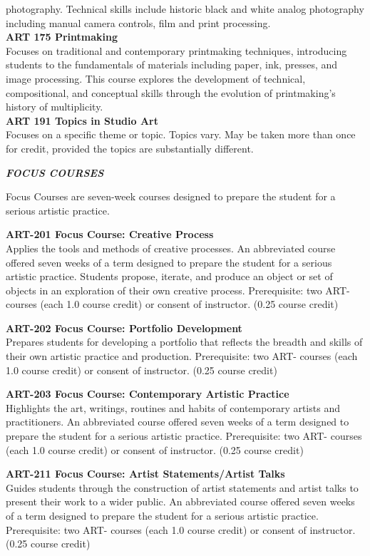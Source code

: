 \documentclass[
  letterpaper,
]{scrbook}
\begin{document}
photography. Technical skills include historic black and white analog
photography including manual camera controls, film and print
processing.\\
\textbf{ART 175 Printmaking}\\
Focuses on traditional and contemporary printmaking techniques,
introducing students to the fundamentals of materials including paper,
ink, presses, and image processing. This course explores the development
of technical, compositional, and conceptual skills through the evolution
of printmaking's history of multiplicity.\\
\textbf{ART 191 Topics in Studio Art}\\
Focuses on a specific theme or topic. Topics vary. May be taken more
than once for credit, provided the topics are substantially different.

\textbf{\emph{FOCUS COURSES}}

Focus Courses are seven-week courses designed to prepare the student for
a serious artistic practice.

\textbf{ART-201 Focus Course: Creative Process}\\
Applies the tools and methods of creative processes. An abbreviated
course offered seven weeks of a term designed to prepare the student for
a serious artistic practice. Students propose, iterate, and produce an
object or set of objects in an exploration of their own creative
process. Prerequisite: two ART- courses (each 1.0 course credit) or
consent of instructor. (0.25 course credit)

\textbf{ART-202 Focus Course: Portfolio Development}\\
Prepares students for developing a portfolio that reflects the breadth
and skills of their own artistic practice and production. Prerequisite:
two ART- courses (each 1.0 course credit) or consent of instructor.
(0.25 course credit)

\textbf{ART-203 Focus Course: Contemporary Artistic Practice}\\
Highlights the art, writings, routines and habits of contemporary
artists and practitioners. An abbreviated course offered seven weeks of
a term designed to prepare the student for a serious artistic practice.
Prerequisite: two ART- courses (each 1.0 course credit) or consent of
instructor. (0.25 course credit)

\textbf{ART-211 Focus Course: Artist Statements/Artist Talks}\\
Guides students through the construction of artist statements and artist
talks to present their work to a wider public. An abbreviated course
offered seven weeks of a term designed to prepare the student for a
serious artistic practice. Prerequisite: two ART- courses (each 1.0
course credit) or consent of instructor. (0.25 course credit)
\end{document}
